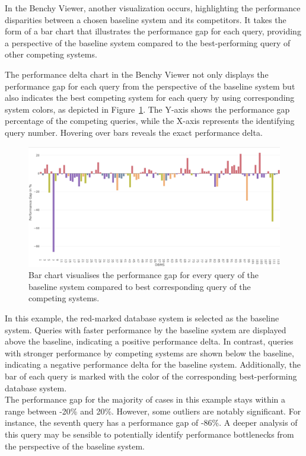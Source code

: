 In the Benchy Viewer, another visualization occurs, highlighting the performance disparities between a chosen baseline system and its competitors. It takes the form of a bar chart that illustrates the performance gap for each query, providing a perspective of the baseline system compared to the best-performing query of other competing systems.

The performance delta chart in the Benchy Viewer not only displays the performance gap for each query from the perspective of the baseline system but also indicates the best competing system for each query by using corresponding system colors, as depicted in Figure~\ref{fig:performance-gap}. The Y-axis shows the performance gap percentage of the competing queries, while the X-axis represents the identifying query number. Hovering over bars reveals the exact performance delta.

\begin{figure}[h]
  \centering
  \includegraphics[width=1\linewidth]{figures/bsp-query-gaps.png}
  \caption{Bar chart visualises the performance gap for every query of the baseline system compared to best corresponding query of the competing systems.}
  \label{fig:performance-gap}
\end{figure}

In this example, the red-marked database system is selected as the baseline system. Queries with faster performance by the baseline system are displayed above the baseline, indicating a positive performance delta. In contrast, queries with stronger performance by competing systems are shown below the baseline, indicating a negative performance delta for the baseline system. Additionally, the bar of each query is marked with the color of the corresponding best-performing database system.\\
The performance gap for the majority of cases in this example stays within a range between -20\% and 20\%. However, some outliers are notably significant. For instance, the seventh query has a performance gap of -86\%. A deeper analysis of this query may be sensible to potentially identify performance bottlenecks from the perspective of the baseline system.

